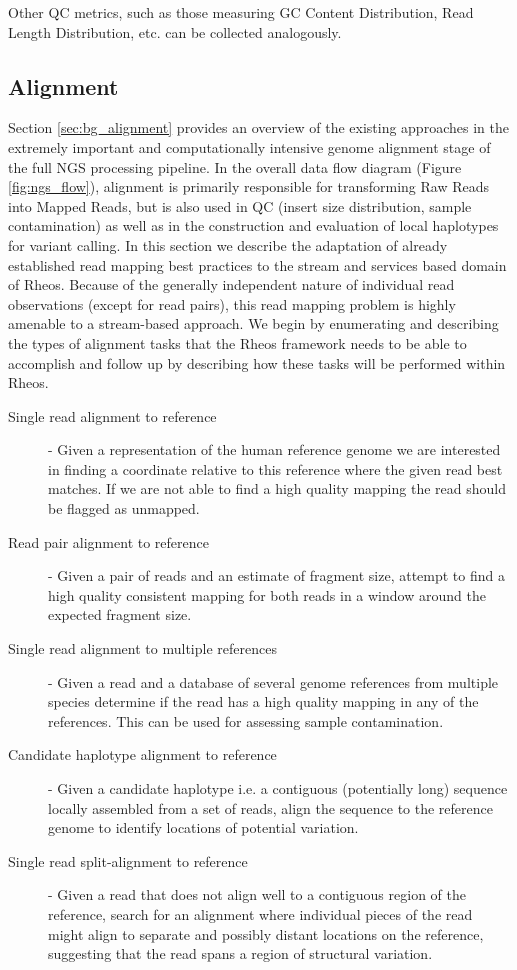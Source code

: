 Other QC metrics, such as those measuring GC Content Distribution, Read Length Distribution, etc. can be collected analogously. 

\subsection{Alignment}\label{sec:main_body_alignment}

Section \ref{sec:bg_alignment} provides an overview of the existing approaches in the extremely important and computationally intensive genome alignment stage of the full NGS processing pipeline. In the overall data flow diagram (Figure \ref{fig:ngs_flow}), alignment is primarily responsible for transforming Raw Reads into Mapped Reads, but is also used in QC (insert size distribution, sample contamination) as well as in the construction and evaluation of local haplotypes for variant calling. In this section we describe the adaptation of already established read mapping best practices to the stream and services based domain of Rheos. Because of the generally independent nature of individual read observations (except for read pairs), this read mapping problem is highly amenable to a stream-based approach. We begin by enumerating and describing the types of alignment tasks that the Rheos framework needs to be able to accomplish and follow up by describing how these tasks will be performed within Rheos.

\begin{description}
    \item [Single read alignment to reference] - Given a representation of the human reference genome we are interested in finding a coordinate relative to this reference where the given read best matches. If we are not able to find a high quality mapping the read should be flagged as unmapped.
    \item [Read pair alignment to reference] - Given a pair of reads and an estimate of fragment size, attempt to find a high quality consistent mapping for both reads in a window around the expected fragment size.
    \item [Single read alignment to multiple references] - Given a read and a database of several genome references from multiple species determine if the read has a high quality mapping in any of the references. This can be used for assessing sample contamination.
    \item [Candidate haplotype alignment to reference] - Given a candidate haplotype i.e. a contiguous (potentially long) sequence locally assembled from a set of reads, align the sequence to the reference genome to identify locations of potential variation.
    \item [Single read split-alignment to reference] - Given a read that does not align well to a contiguous region of the reference, search for an alignment where individual pieces of the read might align to separate and possibly distant locations on the reference, suggesting that the read spans a region of structural variation.
\end{description}

